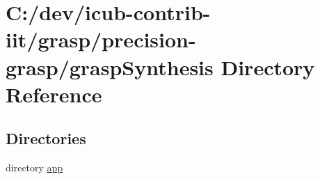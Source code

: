 \section{C\+:/dev/icub-\/contrib-\/iit/grasp/precision-\/grasp/grasp\+Synthesis Directory Reference}
\label{dir_9d238ca717da06a1edac17b3526d7ffb}
\subsection*{Directories}
\begin{DoxyCompactItemize}
\item 
directory \hyperlink{dir_cfb025b1c4fc72ca93d561158001e499}{app}
\end{DoxyCompactItemize}

